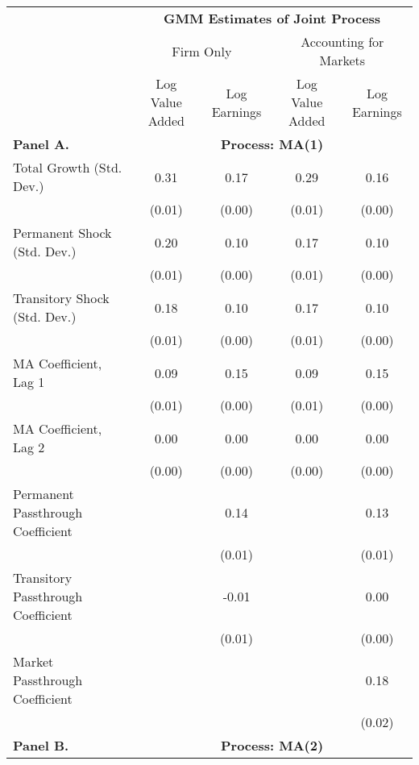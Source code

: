 \begin{tabular}{lcccc}
\toprule 
\midrule 
  & \multicolumn{4}{c}{\textbf{GMM Estimates of Joint Process}} \\
 \cmidrule(lr){2-5} 
 & \multicolumn{2}{c}{Firm Only} & \multicolumn{2}{c}{Accounting for Markets} \\
 \cmidrule(lr){2-5} 
 & Log Value Added & Log Earnings & Log Value Added & Log Earnings \\
\midrule 
\textbf{Panel A.} & \multicolumn{4}{c}{\textbf{Process: MA(1)}} \\
 \cmidrule(lr){2-5} 
Total Growth (Std. Dev.) & 0.31 & 0.17 & 0.29 & 0.16 \\
  & {(\footnotesize 0.01)} & {(\footnotesize 0.00)} & {(\footnotesize 0.01)} & {(\footnotesize 0.00)} \\[5pt]
Permanent Shock (Std. Dev.) & 0.20 & 0.10 & 0.17 & 0.10 \\
  & {(\footnotesize 0.01)} & {(\footnotesize 0.00)} & {(\footnotesize 0.01)} & {(\footnotesize 0.00)} \\[5pt]
Transitory Shock (Std. Dev.) & 0.18 & 0.10 & 0.17 & 0.10 \\
  & {(\footnotesize 0.01)} & {(\footnotesize 0.00)} & {(\footnotesize 0.01)} & {(\footnotesize 0.00)} \\[5pt]
MA Coefficient, Lag 1 & 0.09 & 0.15 & 0.09 & 0.15 \\
  & {(\footnotesize 0.01)} & {(\footnotesize 0.00)} & {(\footnotesize 0.01)} & {(\footnotesize 0.00)} \\[5pt]
MA Coefficient, Lag 2 & 0.00 & 0.00 & 0.00 & 0.00 \\
  & {(\footnotesize 0.00)} & {(\footnotesize 0.00)} & {(\footnotesize 0.00)} & {(\footnotesize 0.00)} \\[5pt]
Permanent Passthrough Coefficient &  & 0.14 &  & 0.13 \\
  &  & {(\footnotesize 0.01)} &  & {(\footnotesize 0.01)} \\[5pt]
Transitory Passthrough Coefficient &  & -0.01 &  & 0.00 \\
  &  & {(\footnotesize 0.01)} &  & {(\footnotesize 0.00)} \\[5pt]
Market Passthrough Coefficient &  &  &  & 0.18 \\
  &  &  &  & {(\footnotesize 0.02)} \\
\midrule 
\textbf{Panel B.} & \multicolumn{4}{c}{\textbf{Process: MA(2)}} \\
 \cmidrule(lr){2-5} 

\end{tabular}
